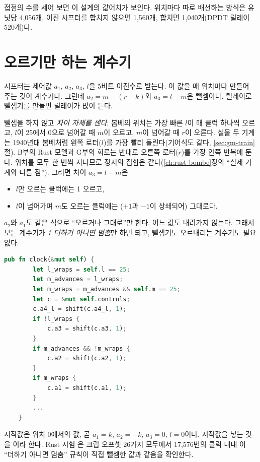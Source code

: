 접점의 수를 세어 보면 이 설계의 값어치가 보인다. 위치마다 따로 배선하는 방식은 유닛당 4,056개, 이진
시프터를 합치지 않으면 1,560개, 합치면 1,040개(DPDT 릴레이 520개)다.

\section{오르기만 하는 계수기}\label{sec:relay-counter}

시프터는 제어값 $a_1$, $a_2$, $a_3$, $l$을 5비트 이진수로 받는다. 이 값을 매 위치마다 만들어 주는 것이
계수기다. 그런데 $a_2 = m - (r+k)$와 $a_3 = l - m$은 뺄셈이다. 릴레이로 뺄셈기를 만들면 릴레이가 많이 든다.

\Why 뺄셈을 하지 않고 \emph{차이 자체를 센다}. 봄베의 위치는 가장 빠른 $l$이 매 클럭 하나씩 오르고,
$l$이 25에서 0으로 넘어갈 때 $m$이 오르고, $m$이 넘어갈 때 $r$이 오른다. 실물 두 기계는 1940년대 봄베처럼 왼쪽
로터($l$)를 가장 빨리 돌린다(기어식도 같다, \ref{sec:gm-train}절). B부의 Rust 모델과 G부의 회로는 반대로 오른쪽 로터($r$)를
가장 안쪽 반복에 둔다. 위치를 모두 한 번씩 지나므로 정지의 집합은 같다(\ref{ch:rust-bombe}장의 ``실제 기계와 다른 점''). 그러면 차이 $a_3 = l - m$은
\begin{itemize}
\item $l$만 오르는 클럭에는 1 오르고,
\item $l$이 넘어가며 $m$도 오르는 클럭에는 ($+1$과 $-1$이 상쇄되어) 그대로다.
\end{itemize}
$a_2$와 $a_1$도 같은 식으로 ``오르거나 그대로''만 한다. 어느 값도 내려가지 않는다. 그래서 모든 계수기가
\emph{1 더하기 아니면 멈춤}만 하면 되고, 뺄셈기도 오르내리는 계수기도 필요 없다.

\begin{lstlisting}[language=Rust,caption={\code{relay.rs}: 한 클럭. 더하기(mod 26)와 멈춤만 쓴다.},label={lst:r-counters}]
    pub fn clock(&mut self) {
        let l_wraps = self.l == 25;
        let m_advances = l_wraps;
        let m_wraps = m_advances && self.m == 25;
        let c = &mut self.controls;
        c.a4_l = shift(c.a4_l, 1);
        if !l_wraps {
            c.a3 = shift(c.a3, 1);
        }
        if m_advances && !m_wraps {
            c.a2 = shift(c.a2, 1);
        }
        if m_wraps {
            c.a1 = shift(c.a1, 1);
        }
        ...
    }
\end{lstlisting}

시작값은 위치 0에서의 값, 곧 $a_1 = k$, $a_2 = -k$, $a_3 = 0$, $l = 0$이다. 시작값을 넣는 것을 이라
한다. Rust 시험 은 크립 오프셋 26가지 모두에서 17,576번의
클럭 내내 이 ``더하기 아니면 멈춤'' 규칙이 직접 뺄셈한 값과 같음을 확인한다.

